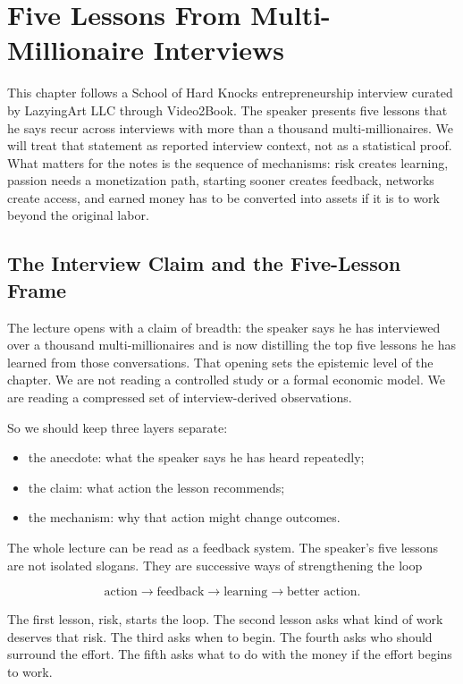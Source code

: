 \chapter{Five Lessons From Multi-Millionaire Interviews}

This chapter follows a School of Hard Knocks entrepreneurship interview curated by LazyingArt LLC through Video2Book. The speaker presents five lessons that he says recur across interviews with more than a thousand multi-millionaires. We will treat that statement as reported interview context, not as a statistical proof. What matters for the notes is the sequence of mechanisms: risk creates learning, passion needs a monetization path, starting sooner creates feedback, networks create access, and earned money has to be converted into assets if it is to work beyond the original labor.

\section{The Interview Claim and the Five-Lesson Frame}

The lecture opens with a claim of breadth: the speaker says he has interviewed over a thousand multi-millionaires and is now distilling the top five lessons he has learned from those conversations. That opening sets the epistemic level of the chapter. We are not reading a controlled study or a formal economic model. We are reading a compressed set of interview-derived observations.

So we should keep three layers separate:

\begin{itemize}
\item the anecdote: what the speaker says he has heard repeatedly;
\item the claim: what action the lesson recommends;
\item the mechanism: why that action might change outcomes.
\end{itemize}

The whole lecture can be read as a feedback system. The speaker's five lessons are not isolated slogans. They are successive ways of strengthening the loop

\begin{equation}
\text{action}
\longrightarrow
\text{feedback}
\longrightarrow
\text{learning}
\longrightarrow
\text{better action}.
\end{equation}

The first lesson, risk, starts the loop. The second lesson asks what kind of work deserves that risk. The third asks when to begin. The fourth asks who should surround the effort. The fifth asks what to do with the money if the effort begins to work.

